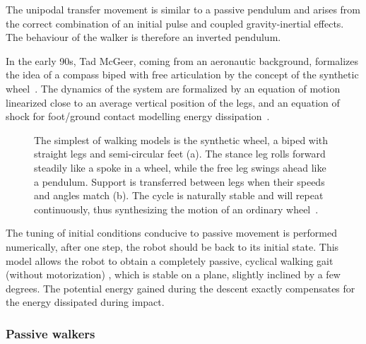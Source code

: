 The unipodal transfer movement is similar to a passive pendulum and arises from the correct combination of an initial pulse and coupled gravity-inertial effects. The behaviour of the walker is therefore an inverted pendulum.

In the early 90s, Tad McGeer, coming from an aeronautic background, formalizes the idea of a compass biped with free articulation by the concept of the synthetic wheel~\cite{mcgeer1990passive}.
The dynamics of the system are formalized by an equation of motion linearized close to an average vertical position of the legs, and an equation of shock for foot/ground contact modelling energy dissipation~\cite{mcgeer1992principles}.

\begin{figure}[tb]
\centering
    \hfil
    \caption{The simplest of walking models is the synthetic wheel, a biped with straight legs and semi-circular feet (a). The stance leg rolls forward steadily like a spoke in a wheel, while the free leg swings ahead like a pendulum. Support is transferred between legs when their speeds and angles match (b). The cycle is naturally stable and will repeat continuously, thus synthesizing the motion of an ordinary wheel~\cite{mcgeer1992principles}.}
    \label{fig:synthetic-wheel}
\end{figure}


The tuning of initial conditions conducive to passive movement is performed numerically, after one step, the robot should be back to its initial state. This model allows the robot to obtain a completely passive, cyclical walking gait (without motorization) , which is stable on a plane, slightly inclined by a few degrees. The potential energy gained during the descent exactly compensates for the energy dissipated during impact.


\subsubsection{Passive walkers} %

\begin{figure}[tb]
\centering
    \hfil
    \caption{}
    \label{fig:mcgeer_work}
\end{figure}

